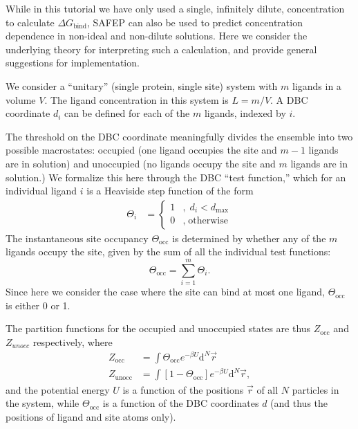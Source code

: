 \documentclass[9pt,tutorial]{Styling/livecoms}
\begin{document}
While in this tutorial we have only used a single, infinitely dilute, concentration to calculate  $\Delta G_\mathrm{bind}$, SAFEP can also be used to predict concentration dependence in non-ideal and non-dilute solutions.  Here we consider the underlying theory for interpreting such a calculation, and provide general suggestions for implementation.

We consider a ``unitary'' (single protein, single site\cite{Salari2018}) system with $m$ ligands in a volume $V$. The ligand concentration in this system is $L=m/V$. A DBC coordinate $d_i$ can be defined for each of the $m$ ligands, indexed by $i$.  

The threshold on the DBC coordinate meaningfully divides the ensemble into two possible macrostates: occupied (one ligand occupies the site and $m-1$ ligands are in solution) and unoccupied (no ligands occupy the site and $m$ ligands are in solution.)  We formalize this here through the DBC ``test function,'' which for an individual ligand $i$ is a Heaviside step function  of the form 
\begin{align} 
   \Theta_i &= \begin{cases}
        1 &, \; d_{i} < d_\mathrm{max}\\
        0 &, \; \text{otherwise}
    \end{cases}
\end{align}
The instantaneous site occupancy $\Theta_\mathrm{occ}$ is determined by whether any of the $m$ ligands occupy the site, given by the sum of all the individual test functions:
\begin{equation}
   \Theta_\mathrm{occ}=\sum_{i=1}^m\Theta_i. 
\end{equation}
Since here we consider the case where the site can bind at most one ligand, $\Theta_\mathrm{occ}$ is either 0 or 1.  

The  partition functions for the occupied and unoccupied states are thus $Z_\mathrm{occ}$ and $Z_{unocc}$ respectively, where 
\begin{align}
    Z_{\mathrm{occ}} &=\int \Theta_\mathrm{occ}e^{-\beta U} \mathrm{d}^N\vec{r}\\ 
    Z_{\mathrm{unocc}} &= \int \left[1-\Theta_\mathrm{occ}\right]e^{-\beta U} \mathrm{d}^N\vec{r} , 
\end{align}
and the potential energy $U$ is a function of the positions $\vec{r}$ of all $N$ particles in the system, while $\Theta_\mathrm{occ}$ is a function of the DBC coordinates $d$ (and thus the positions of ligand and site atoms only).  
\end{document}
